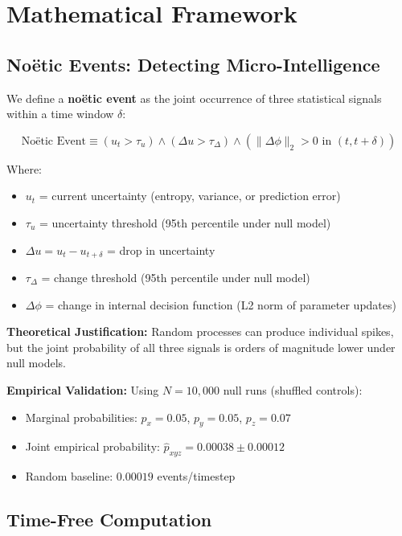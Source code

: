 \documentclass[11pt]{article}
\begin{document}
\section{Mathematical Framework}

\subsection{Noëtic Events: Detecting Micro-Intelligence}

We define a \textbf{noëtic event} as the joint occurrence of three statistical signals within a time window $\delta$:

\[
\text{Noëtic Event} \equiv (u_t > \tau_u) \land (\Delta u > \tau_\Delta) \land (\|\Delta\phi\|_2 > 0 \text{ in } (t, t+\delta))
\]

Where:
\begin{itemize}
    \item $u_t$ = current uncertainty (entropy, variance, or prediction error)
    \item $\tau_u$ = uncertainty threshold (95th percentile under null model)
    \item $\Delta u = u_t - u_{t+\delta}$ = drop in uncertainty
    \item $\tau_\Delta$ = change threshold (95th percentile under null model)
    \item $\Delta\phi$ = change in internal decision function (L2 norm of parameter updates)
\end{itemize}

\textbf{Theoretical Justification:} Random processes can produce individual spikes, but the joint probability of all three signals is orders of magnitude lower under null models.

\textbf{Empirical Validation:} Using $N=10,000$ null runs (shuffled controls):
\begin{itemize}
    \item Marginal probabilities: $p_x = 0.05$, $p_y = 0.05$, $p_z = 0.07$
    \item Joint empirical probability: $\hat{p}_{xyz} = 0.00038 \pm 0.00012$
    \item Random baseline: $0.00019$ events/timestep
\end{itemize}

\subsection{Time-Free Computation}
\end{document}
